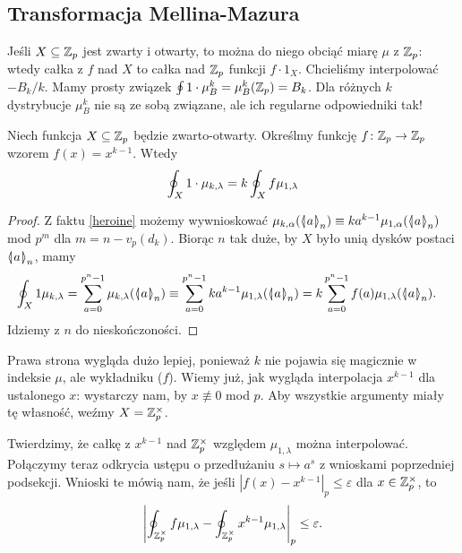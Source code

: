 \subsection{Transformacja Mellina-Mazura}
Jeśli  $X \subseteq \mathbb Z_p$ jest zwarty i otwarty, to można do niego obciąć miarę $\mu$ z $\mathbb Z_p$: wtedy całka z $f$ nad $X$ to całka nad $\mathbb Z_p$ funkcji $f \cdot 1_X$.
Chcieliśmy interpolować $-B_k / k$.
Mamy prosty związek $\oint 1 \cdot \mu_B^k = \mu_B^k (\mathbb Z_p) = B_k$.
Dla różnych $k$ dystrybucje $\mu_B^k$ nie są ze sobą związane, ale ich regularne odpowiedniki tak!

\begin{wniosek}
	Niech funkcja $X \subseteq \mathbb Z_p$ będzie zwarto-otwarty.
	Określmy funkcję $f \colon \mathbb Z_p \to \mathbb Z_p$ wzorem $f(x) = x^{k-1}$.
	Wtedy
\[
	\oint_X 1 \cdot \mu_{k, \lambda} = k \oint_X f \mu_{1, \lambda}
\]
\end{wniosek}

\begin{proof}
	Z faktu \ref{heroine} możemy wywnioskować $\mu_{k, \alpha}(\mathrel{\langle\mkern-3.85mu\mid\mkern-4mu} {a}\mathrel{\mkern-4mu\mid\mkern-3.85mu\rangle}_{n}) \equiv ka^{k-1} \mu_{1, \alpha} (\mathrel{\langle\mkern-3.85mu\mid\mkern-4mu} {a}\mathrel{\mkern-4mu\mid\mkern-3.85mu\rangle}_{n})$ mod $p^m$ dla $m = n - v_p (d_k)$.
	Biorąc $n$ tak duże, by $X$ było unią dysków postaci $\mathrel{\langle\mkern-3.85mu\mid\mkern-4mu} {a}\mathrel{\mkern-4mu\mid\mkern-3.85mu\rangle}_{n}$, mamy
	\begin{align*}
		\kobint_X 1 \mu_{k, \lambda} & = 
		\sum_{a=0}^{p^n-1} \mu_{k, \lambda} (\dysk{a}{n}) \equiv 
		\sum_{a=0}^{p^n-1} ka^{k-1} \mu_{1, \lambda} (\dysk{a}{n}) = 
		k \sum_{a=0}^{p^n-1} f(a) \mu_{1, \lambda} (\dysk{a}{n}).
	\end{align*}
	Idziemy z $n$ do nieskończoności.
\end{proof}

Prawa strona wygląda dużo lepiej, ponieważ $k$ nie pojawia się magicznie w indeksie $\mu$, ale wykładniku ($f$).
Wiemy już, jak wygląda interpolacja $x^{k-1}$ dla ustalonego $x$: wystarczy nam, by $x \not\equiv 0$ mod $p$.
Aby wszystkie argumenty miały tę własność, weźmy $X = \mathbb Z_p^\times$.

Twierdzimy, że całkę z $x^{k-1}$ nad $\mathbb Z_p^\times$ względem $\mu_{1, \lambda}$ można interpolować.
Połączymy teraz odkrycia ustępu o przedłużaniu $s \mapsto a^s$ z wnioskami poprzedniej podsekcji.
Wnioski te mówią nam, że jeśli $|f(x) - x^{k-1}|_p \le \varepsilon$ dla $x \in \mathbb Z_p^\times$, to
\[
	\left|\oint_{\mathbb Z_p^\times} f \mu_{1, \lambda} - \oint_{\mathbb Z_p^\times} x^{k-1} \mu_{1, \lambda}\right|_p \le \varepsilon.
\]

